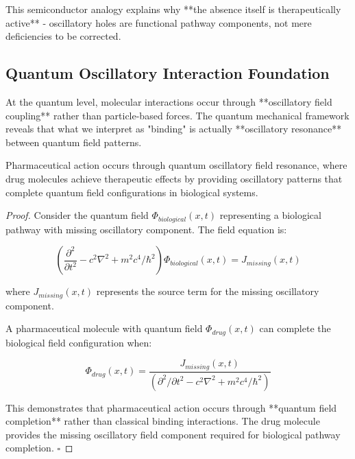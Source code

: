 This semiconductor analogy explains why **the absence itself is therapeutically active** - oscillatory holes are functional pathway components, not mere deficiencies to be corrected.

\subsection{Quantum Oscillatory Interaction Foundation}

At the quantum level, molecular interactions occur through **oscillatory field coupling** rather than particle-based forces. The quantum mechanical framework reveals that what we interpret as "binding" is actually **oscillatory resonance** between quantum field patterns.

\begin{theorem}
Pharmaceutical action occurs through quantum oscillatory field resonance, where drug molecules achieve therapeutic effects by providing oscillatory patterns that complete quantum field configurations in biological systems.
\end{theorem}

\begin{proof}
Consider the quantum field $\Phi_{biological}(x,t)$ representing a biological pathway with missing oscillatory component. The field equation is:

\begin{equation}
\left(\frac{\partial^2}{\partial t^2} - c^2\nabla^2 + m^2c^4/\hbar^2\right)\Phi_{biological}(x,t) = J_{missing}(x,t)
\end{equation}

where $J_{missing}(x,t)$ represents the source term for the missing oscillatory component.

A pharmaceutical molecule with quantum field $\Phi_{drug}(x,t)$ can complete the biological field configuration when:

\begin{equation}
\Phi_{drug}(x,t) = \frac{J_{missing}(x,t)}{(\partial^2/\partial t^2 - c^2\nabla^2 + m^2c^4/\hbar^2)}
\end{equation}

This demonstrates that pharmaceutical action occurs through **quantum field completion** rather than classical binding interactions. The drug molecule provides the missing oscillatory field component required for biological pathway completion. $\square$
\end{proof}

